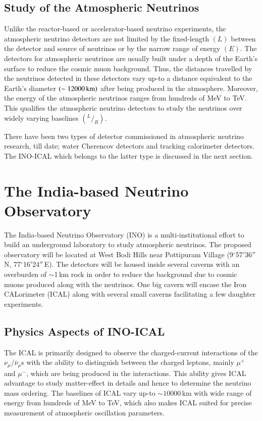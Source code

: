 \subsection{Study of the Atmospheric Neutrinos}
Unlike the reactor-based or accelerator-based neutrino experiments,
the atmospheric neutrino detectors are not limited by the fixed-length
$\left(L\right)$ between the detector and source of neutrinos or by
the narrow range of energy $\left(E\right)$. The detectors for
atmospheric neutrinos are usually built under a depth of the Earth's
surface to reduce the cosmic muon background. Thus, the distances
travelled by the neutrinos detected in these detectors vary up-to a
distance equivalent to the Earth's diameter
$\left(\sim 12000\text{\,km}\right)$ after being produced in the
atmosphere. Moreover, the energy of the atmospheric neutrinos ranges
from hundreds of MeV to TeV. This qualifies the atmospheric neutrino
detectors to study the neutrinos over widely varying baselines
$\left(^{L}/_{R}\right)$.

There have been two types of detector commissioned in atmospheric
neutrino research, till date; water Cherencov detectors and tracking
calorimeter detectors. The INO-ICAL which belongs to the latter type
is discussed in the next section.

\section{The India-based Neutrino Observatory}
The India-based Neutrino Observatory (INO)\cite{inowhite,inoreport}
is a multi-institutional effort to build an underground laboratory to
study atmospheric neutrinos. The proposed observatory will be located
at West Bodi Hills near Pottipuram Village (9$^\circ$57$'$36$''$\,N,
77$^\circ$16$'$24$''$\,E). The detectors will be housed inside several
caverns with an overburden of $\sim$1\,km rock in order to reduce the
background due to cosmic muons produced along with the neutrinos. One
big cavern will encase the Iron CALorimeter (ICAL) along with several
small caverns facilitating a few daughter experiments.

\subsection{Physics Aspects of INO-ICAL}
The ICAL is primarily designed to observe the charged-current
interactions of the $\nu_{\mu}/\bar{\nu}_{\mu}$s with the ability to
distinguish between the charged leptons, mainly $\mu^{+}$ and $\mu^{-}$,
which are being produced in the interactions. This ability gives ICAL
advantage to study matter-effect in details and hence to determine the
neutrino mass ordering. The baselines of ICAL vary up-to
$\sim 10000$\,km with wide range of energy from hundreds of MeV to
TeV, which also makes ICAL suited for precise measurement of
atmospheric oscillation parameters. %

